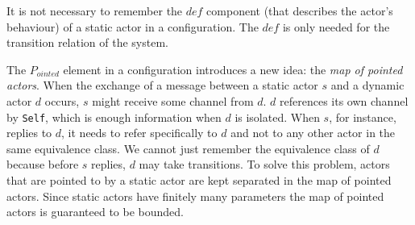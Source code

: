 \documentclass[a4paper]{report}
\numberwithin{algorithm}{chapter}
\begin{document}
\begin{rem}
It is not necessary to remember the $\mathit{def}$ component (that describes the actor's behaviour) of a static actor in a configuration.
The $\mathit{def}$ is only needed for the transition relation of the system.
\end{rem}
The $P_{ointed}$ element in a configuration introduces a new idea: the \emph{map of pointed actors}.
When the exchange of a message between a static actor $s$ and a dynamic actor $d$ occurs, $s$ might receive some channel from $d$.
$d$ references its own channel by \texttt{Self}, which is enough information when $d$ is isolated.
When $s$, for instance, replies to $d$, it needs to refer specifically to $d$ and not to any other actor in the same equivalence class.
We cannot just remember the equivalence class of $d$ because before $s$ replies, $d$ may take transitions.
To solve this problem, actors that are pointed to by a static actor are kept separated in the map of pointed actors.
Since static actors have finitely many parameters the map of pointed actors is guaranteed to be bounded.
\end{document}
